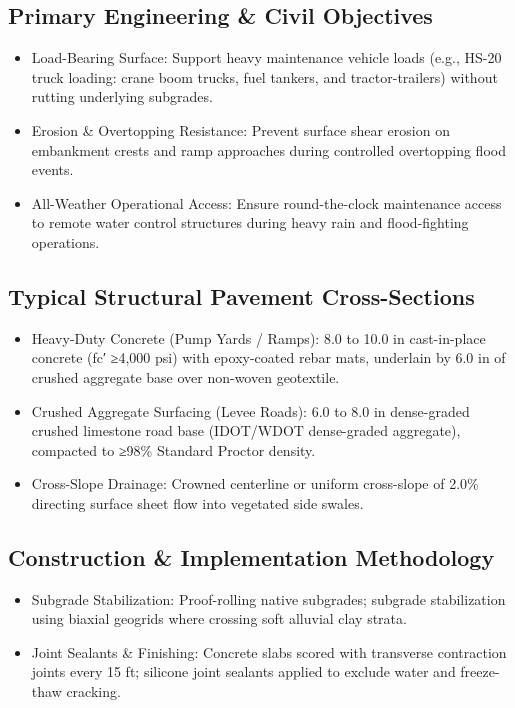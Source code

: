\documentclass[
  letterpaper,
  DIV=11,
  numbers=noendperiod]{scrreprt}
\begin{document}
\subsection{Primary Engineering \& Civil
Objectives}\label{primary-engineering-civil-objectives}

\begin{itemize}
\item
  Load-Bearing Surface: Support heavy maintenance vehicle loads (e.g.,
  HS-20 truck loading: crane boom trucks, fuel tankers, and
  tractor-trailers) without rutting underlying subgrades.
\item
  Erosion \& Overtopping Resistance: Prevent surface shear erosion on
  embankment crests and ramp approaches during controlled overtopping
  flood events.
\item
  All-Weather Operational Access: Ensure round-the-clock maintenance
  access to remote water control structures during heavy rain and
  flood-fighting operations.
\end{itemize}

\subsection{Typical Structural Pavement
Cross-Sections}\label{typical-structural-pavement-cross-sections}

\begin{itemize}
\item
  Heavy-Duty Concrete (Pump Yards / Ramps): 8.0 to 10.0 in cast-in-place
  concrete (fc′ ≥4,000 psi) with epoxy-coated rebar mats, underlain by
  6.0 in of crushed aggregate base over non-woven geotextile.
\item
  Crushed Aggregate Surfacing (Levee Roads): 6.0 to 8.0 in dense-graded
  crushed limestone road base (IDOT/WDOT dense-graded aggregate),
  compacted to ≥98\% Standard Proctor density.
\item
  Cross-Slope Drainage: Crowned centerline or uniform cross-slope of
  2.0\% directing surface sheet flow into vegetated side swales.
\end{itemize}

\subsection{Construction \& Implementation
Methodology}\label{construction-implementation-methodology-20}

\begin{itemize}
\item
  Subgrade Stabilization: Proof-rolling native subgrades; subgrade
  stabilization using biaxial geogrids where crossing soft alluvial clay
  strata.
\item
  Joint Sealants \& Finishing: Concrete slabs scored with transverse
  contraction joints every 15 ft; silicone joint sealants applied to
  exclude water and freeze-thaw cracking.
\end{itemize}
\end{document}
